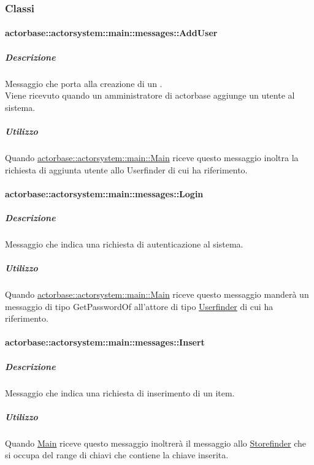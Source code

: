 \documentclass{scalatekids-article}
\begin{document}
\subsubsection{Classi}

\paragraph{actorbase::actorsystem::main::messages::AddUser}
\label{sec:actorbase::actorsystem::main::messages::AddUser}

\subparagraph{Descrizione}
Messaggio che porta alla creazione di un .\\Viene ricevuto
quando un amministratore di actorbase aggiunge un utente al sistema.

\subparagraph{Utilizzo}
Quando \hyperref[sec:actorbase::actorsystem::main::Main]{actorbase::actorsystem::main::Main}
riceve questo messaggio inoltra la richiesta di aggiunta utente allo
Userfinder di cui ha riferimento.

\paragraph{actorbase::actorsystem::main::messages::Login}
\label{sec:actorbase::actorsystem::main::messages::Login}

\subparagraph{Descrizione}
Messaggio che indica una richiesta di autenticazione al sistema.

\subparagraph{Utilizzo}
Quando \hyperref[sec:actorbase::actorsystem::main::Main]{actorbase::actorsystem::main::Main}
riceve questo messaggio manderà un messaggio di tipo GetPasswordOf
all'attore di tipo \hyperref[sec:actorbase::actorsystem::userfinder::Userfinder]{Userfinder} di cui ha riferimento.

\paragraph{actorbase::actorsystem::main::messages::Insert}
\label{sec:actorbase::actorsystem::main::messages::Insert}

\subparagraph{Descrizione}
Messaggio che indica una richiesta di inserimento di un item.

\subparagraph{Utilizzo}

Quando \hyperref[sec:actorbase::actorsystem::main::Main]{Main}
riceve questo messaggio inoltrerà il messaggio allo \hyperref[sec:actorbase::actorsystem::storefinder::Storefinder]{Storefinder}
che si occupa del range di chiavi che contiene la chiave inserita.
\end{document}
